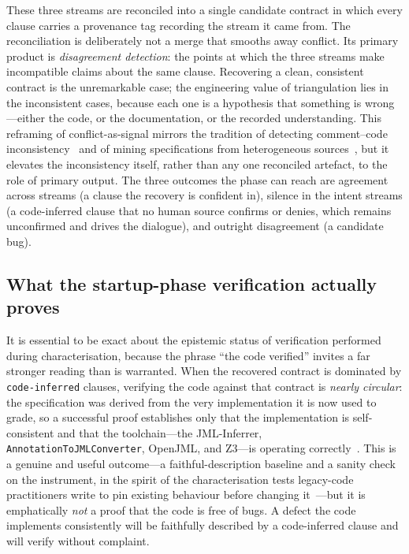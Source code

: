 These three streams are reconciled into a single candidate contract in which every clause carries a provenance tag recording the stream it came from. The reconciliation is deliberately not a merge that smooths away conflict. Its primary product is \emph{disagreement detection}: the points at which the three streams make incompatible claims about the same clause. Recovering a clean, consistent contract is the unremarkable case; the engineering value of triangulation lies in the inconsistent cases, because each one is a hypothesis that something is wrong---either the code, or the documentation, or the recorded understanding. This reframing of conflict-as-signal mirrors the tradition of detecting comment--code inconsistency~\cite{tan2012tcomment,wen2019codecomment} and of mining specifications from heterogeneous sources~\cite{ammons2002mining,ernst2007daikon}, but it elevates the inconsistency itself, rather than any one reconciled artefact, to the role of primary output. The three outcomes the phase can reach are agreement across streams (a clause the recovery is confident in), silence in the intent streams (a code-inferred clause that no human source confirms or denies, which remains unconfirmed and drives the dialogue), and outright disagreement (a candidate bug).

\subsection{What the startup-phase verification actually proves}\label{subsec:a5-proves}

It is essential to be exact about the epistemic status of verification performed during characterisation, because the phrase ``the code verified'' invites a far stronger reading than is warranted. When the recovered contract is dominated by \texttt{code-inferred} clauses, verifying the code against that contract is \emph{nearly circular}: the specification was derived from the very implementation it is now used to grade, so a successful proof establishes only that the implementation is self-consistent and that the toolchain---the JML-Inferrer, \texttt{AnnotationToJMLConverter}, OpenJML, and Z3---is operating correctly~\cite{cok2014openjml,demoura2008z3}. This is a genuine and useful outcome---a faithful-description baseline and a sanity check on the instrument, in the spirit of the characterisation tests legacy-code practitioners write to pin existing behaviour before changing it~\cite{feathers2004legacy}---but it is emphatically \emph{not} a proof that the code is free of bugs. A defect the code implements consistently will be faithfully described by a code-inferred clause and will verify without complaint.

